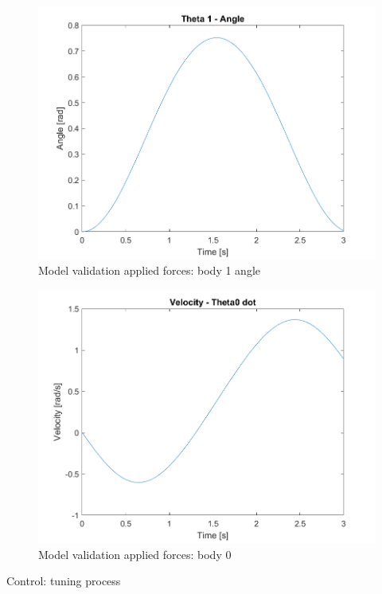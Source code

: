 \begin{figure}[H]
  \centering
  \includegraphics[scale=1]{graphics/Integration/theta1.png}
  \caption{Model validation applied forces: body 1 angle}
  \label{fig:Model validation applied forces: body 1 angular position}
\end{figure}

\begin{figure}[H]
  \centering
  \includegraphics[scale=1]{graphics/Integration/dtheta0.png}
  \caption{Model validation applied forces: body 0}
  \label{fig:Model validation applied forces: body 0 velocity}
\end{figure}

Control: tuning process


